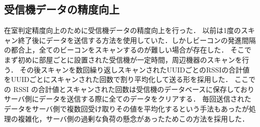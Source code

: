 
\subsection{受信機データの精度向上}
在室判定精度向上のために受信機データの精度向上を行った．
以前は1度のスキャン終了後にデータを送信する方法を使用していた．しかしビーコンの発進間隔の都合上，全てのビーコンをスキャンするのが難しい場合が存在した．
そこでまず初めに部屋ごとに設置された受信機が一定時間，周辺機器のスキャンを行う．
その後スキャンを数回繰り返しスキャンされたUUIDごとのRSSIの合計値をUUIDごとにスキャンされた回数で割り平均化して送る形を採用した．
ここでの RSSI の合計値とスキャンされた回数は受信機のデータベースに保存しておりサーバ側にデータを送信する際に全てのデータをクリアする．
毎回送信されたデータをサーバ側で複数回受け取りその値を平均化するという手法もあったが処理の複雑化，サーバ側の過剰な負荷の懸念があったためこの方法を採用した．